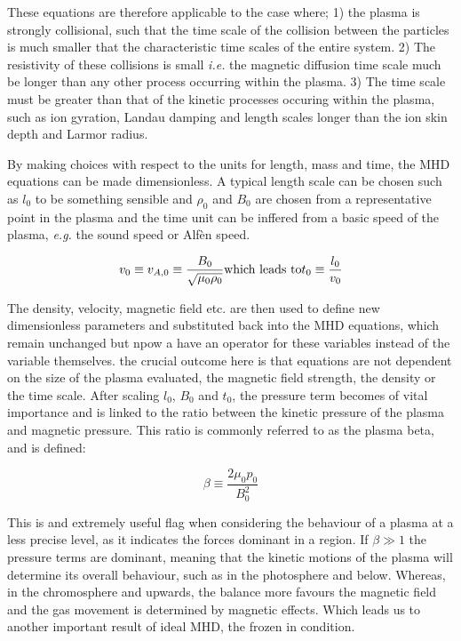These equations are therefore applicable to the case where; 1) the plasma is strongly collisional, such that the time scale of the collision between the particles is much smaller that the characteristic time scales of the entire system.
2) The resistivity of these collisions is small \emph{i.e.} the magnetic diffusion time scale much be longer than any other process occurring within the plasma.
3) The time scale must be greater than that of the kinetic processes occuring within the plasma, such as ion gyration, Landau damping and length scales longer than the ion skin depth and Larmor radius.

By making choices with respect to the units for length, mass and time, the MHD equations can be made dimensionless.
A typical length scale can be chosen such as $l_0$ to be something sensible and $\rho_0$ and $B_0$ are chosen from a representative point in the plasma and the time unit can be inffered from a basic speed of the plasma, \emph{e.g.} the sound speed or Alf{\`e}n speed.

\begin{equation}
	v_0 \equiv v_{A,0} \equiv \frac{B_0}{\sqrt{\mu_0\rho_0}} \textnormal{which leads to} t_0 \equiv \frac{l_0}{v_0} 
\end{equation}

The density, velocity, magnetic field etc. are then used to define new dimensionless parameters and substituted back into the MHD equations, which remain unchanged but npow a have an operator for these variables instead of the variable themselves.
the crucial outcome here is that equations are not dependent on the size of the plasma evaluated, the magnetic field strength, the density or the time scale.
After scaling $l_0$, $B_0$ and $t_0$, the pressure term becomes of vital importance and is linked to the ratio between the kinetic pressure of the plasma and magnetic pressure.
This ratio is commonly referred to as the plasma beta, and is defined:

\begin{equation}
	\beta \equiv \frac{2\mu_0p_0}{B_0^2}
\end{equation} 

This is and extremely useful flag when considering the behaviour of a plasma at a less precise level, as it indicates the forces dominant in a region.
If $\beta \gg 1$ the pressure terms are dominant, meaning that the kinetic motions of the plasma will determine its overall behaviour, such as in the photosphere and below.
Whereas, in the chromosphere and upwards, the balance more favours the magnetic field and the gas movement is determined by magnetic effects.
Which leads us to another important result of ideal MHD, the frozen in condition.

